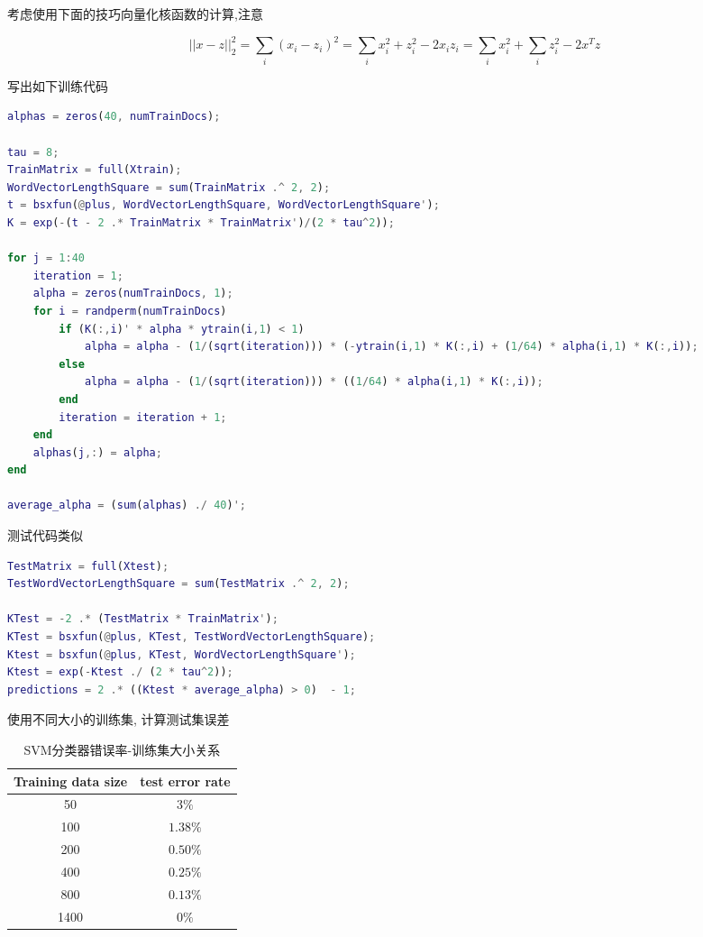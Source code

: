 \documentclass{ctexart}
\begin{document}
\subsection{}

考虑使用下面的技巧向量化核函数的计算,注意

\begin{equation}
	||x-z||_2^2 = \sum_i (x_i - z_i)^2 = \sum_i x_i^2 + z_i^2 - 2x_i z_i = \sum_i x_i^2 + \sum_i z_i^2 - 2 x^T z
\end{equation}

写出如下训练代码

\begin{lstlisting}[language = MATLAB]
alphas = zeros(40, numTrainDocs);

tau = 8;
TrainMatrix = full(Xtrain);
WordVectorLengthSquare = sum(TrainMatrix .^ 2, 2);
t = bsxfun(@plus, WordVectorLengthSquare, WordVectorLengthSquare');
K = exp(-(t - 2 .* TrainMatrix * TrainMatrix')/(2 * tau^2));

for j = 1:40
	iteration = 1;
	alpha = zeros(numTrainDocs, 1);
	for i = randperm(numTrainDocs)
		if (K(:,i)' * alpha * ytrain(i,1) < 1)
			alpha = alpha - (1/(sqrt(iteration))) * (-ytrain(i,1) * K(:,i) + (1/64) * alpha(i,1) * K(:,i));
		else
			alpha = alpha - (1/(sqrt(iteration))) * ((1/64) * alpha(i,1) * K(:,i));
		end
		iteration = iteration + 1;
	end
	alphas(j,:) = alpha;
end

average_alpha = (sum(alphas) ./ 40)';
\end{lstlisting}

测试代码类似

\begin{lstlisting}[language = MATLAB]
TestMatrix = full(Xtest);
TestWordVectorLengthSquare = sum(TestMatrix .^ 2, 2);

KTest = -2 .* (TestMatrix * TrainMatrix');
KTest = bsxfun(@plus, KTest, TestWordVectorLengthSquare);
Ktest = bsxfun(@plus, KTest, WordVectorLengthSquare');
Ktest = exp(-Ktest ./ (2 * tau^2));
predictions = 2 .* ((Ktest * average_alpha) > 0)  - 1;
\end{lstlisting}

使用不同大小的训练集, 计算测试集误差

\begin{table}[ht]
	\centering
	\begin{tabular}{|c|c|}
		\hline
		Training data size & test error rate \\
		\hline
		50 & $3\%$\\
		100 & $1.38\%$\\
		200 & $0.50\%$\\
		400 & $0.25\%$\\
		800 & $0.13\%$\\
		1400 & $0\%$\\
		\hline
	\end{tabular}
	\caption{SVM分类器错误率-训练集大小关系}
\end{table}
\end{document}
